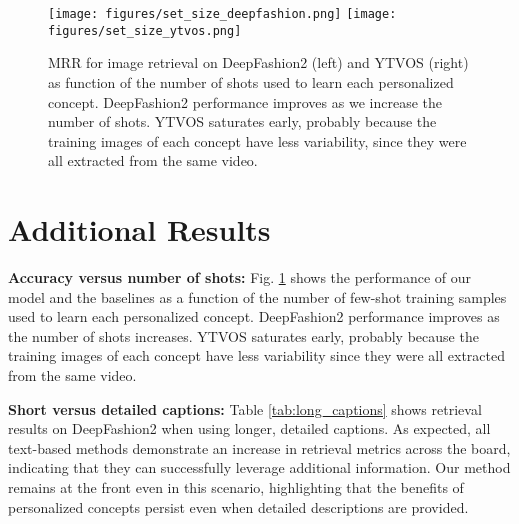 \documentclass[runningheads]{llncs}
\newcommand{\figref}[1]{Fig. \ref{#1}}
\begin{document}
\begin{figure}[h]
    \centering   
    \texttt{[image: figures/set\_size\_deepfashion.png]} \texttt{[image: figures/set\_size\_ytvos.png]} \vspace{-5pt}
    \caption{ MRR for image retrieval on DeepFashion2 (left) and YTVOS (right) as function of the number of shots used to learn each personalized concept. DeepFashion2 performance improves as we increase the number of shots. YTVOS saturates early, probably because the training images of each concept have less variability, since they were all extracted from the same video.
    }

    \label{fig_set_size}
    \vspace{-5pt}
\end{figure}
\section{Additional Results}
\label{sec_additional_results}
\vspace{15pt}\noindent\textbf{Accuracy versus number of shots:}
\figref{fig_set_size} shows the performance of our model and the baselines as a function of the number of few-shot training samples used to learn each personalized concept. DeepFashion2 performance improves as the number of shots increases. YTVOS saturates early, probably because the training images of each concept have less variability since they were all extracted from the same video.

\vspace{15pt}\noindent\textbf{Short versus detailed captions:}
Table \ref{tab:long_captions} shows retrieval results on DeepFashion2 when using longer, detailed captions. As expected, all text-based methods demonstrate an increase in retrieval metrics across the board, indicating that they can successfully leverage additional information. Our method remains at the front even in this scenario, highlighting that the benefits of personalized concepts persist even when detailed descriptions are provided.
\end{document}
